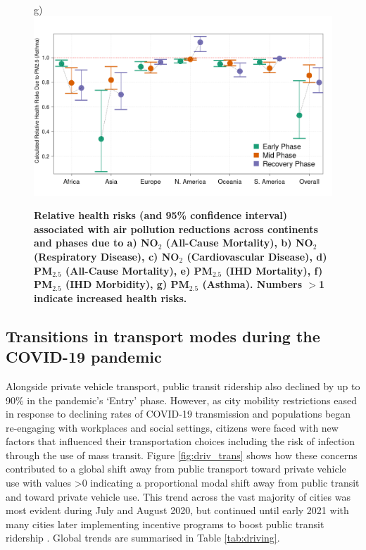 \documentclass[preprint,10pt]{elsarticle} %
\begin{document}
\begin{figure}
\\
\scriptsize{g)}\includegraphics[trim={0 0 25 23},clip,scale=0.23]{Images/pm25Ast_20250207.png}
\caption{\bf Relative health risks (and 95\% confidence interval) associated with air pollution reductions across continents and phases due to 
a) NO$_{2}$ (All-Cause Mortality), 
b) NO$_{2}$ (Respiratory Disease), 
c) NO$_{2}$ (Cardiovascular Disease), 
d) PM$_{2.5}$ (All-Cause Mortality), 
e) PM$_{2.5}$ (IHD Mortality),
f) PM$_{2.5}$ (IHD Morbidity),
g) PM$_{2.5}$ (Asthma). Numbers $>$1 indicate increased health risks.}
 \label{fig:risks}
\end{figure}



\subsection*{Transitions in transport modes during the COVID-19 pandemic}

Alongside private vehicle transport, public transit ridership also declined by up to 90\% in the pandemic's `Entry' phase\cite{TransitCovid_Gkiotsalitis}. However, as city mobility restrictions eased in response to declining rates of COVID-19 transmission and populations began re-engaging with workplaces and social settings, citizens were faced with new factors that influenced their transportation choices including the risk of infection through the use of mass transit\cite{BECKTransit}. Figure \ref{fig:driv_trans} shows how these concerns contributed to a global shift away from public transport toward private vehicle use with values \textgreater 0 indicating a proportional modal shift away from public transit and toward private vehicle use. This trend across the vast majority of cities was most evident during July and August 2020, but continued until early 2021 with many cities later implementing incentive programs to boost public transit ridership \cite{dai2021improving}. Global trends are summarised in Table \ref{tab:driving}.
\end{document}
